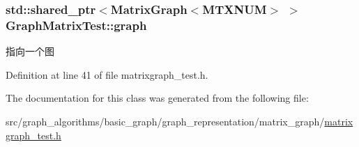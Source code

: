 \subsubsection[{graph}]{\setlength{\rightskip}{0pt plus 5cm}std\+::shared\+\_\+ptr$<${\bf Matrix\+Graph}$<$M\+T\+X\+N\+U\+M$>$ $>$ Graph\+Matrix\+Test\+::graph\hspace{0.3cm}{\ttfamily [protected]}}\label{class_graph_matrix_test_a466258802e52f0a5408f78e809cd6d7c}
指向一个图 

Definition at line 41 of file matrixgraph\+\_\+test.\+h.



The documentation for this class was generated from the following file\+:\begin{DoxyCompactItemize}
\item 
src/graph\+\_\+algorithms/basic\+\_\+graph/graph\+\_\+representation/matrix\+\_\+graph/\hyperlink{matrixgraph__test_8h}{matrixgraph\+\_\+test.\+h}\end{DoxyCompactItemize}
